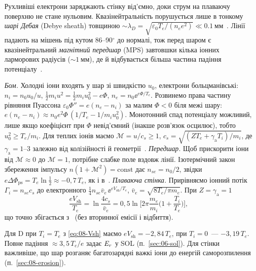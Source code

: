 Рухливіші електрони заряджають стінку від'ємно, доки струм на плаваючу поверхню не стане нульовим. Квазінейтральність порушується лише в тонкому \emph{шарі Дебая} (Debye sheath) товщиною $\sim\lambda_D=\sqrt{\varepsilon_0T_e/(n_ee^2)}\ll\SI{0,1}{мм}$~\cite[с.~23]{AhoMantila2011}. Лінії падають на мішень під кутом 86--90$^\circ$ до нормалі, тож перед шаром є квазінейтральний \emph{магнітний передшар} (MPS) завтовшки кілька іонних ларморових радіусів ($\sim\SI{1}{мм}$), де й відбувається більша частина падіння потенціалу~\cite[с.~23]{AhoMantila2011}.

\begin{derivation}
\emph{Бом.} Холодні іони входять у шар зі швидкістю $u_0$, електрони больцманівські: $n_i=n_0u_0/u$, $\tfrac12m_iu^2=\tfrac12m_iu_0^2-e\Phi$, $n_e=n_0\ee^{e\Phi/T_e}$. Розвинемо права частину рівняння Пуассона $\varepsilon_0\Phi''=e(n_e-n_i)$ за малим $\Phi<0$ біля межі шару: $e(n_e-n_i)\approx n_0e^2\Phi\,(1/T_e-1/m_iu_0^2)$. Монотонний спад потенціалу можливий, лише якщо коефіцієнт при $\Phi$ невід'ємний (інакше розв'язок осцилює), тобто $u_0^2\ge T_e/m_i$. Для теплих іонів маємо $\mathcal{M}=u/c_s\ge1$, $c_s=\sqrt{(ZT_e+\gamma_{\mathrm a}T_i)/m_i}$, де $\gamma_{\mathrm a}=1$--3 залежно від колізійності й геометрії~\cite[с.~24]{AhoMantila2011}.
\emph{Передшар.} Щоб прискорити іони від $\mathcal{M}\approx0$ до $\mathcal{M}=1$, потрібне слабке поле вздовж лінії. Ізотермічний закон збереження імпульсу $n(1+\mathcal{M}^2)=\mathrm{const}$ дає $n_{se}=n_0/2$, звідки $e\Delta\Phi_{\mathrm{ps}}=T_e\ln\tfrac12\approx-0{,}7\,T_e$, як і в~\cite[с.~24]{AhoMantila2011}.
\emph{Плаваюча стінка.} Прирівняємо іонний потік $\Gamma_i=n_{se}c_s$ до електронного $\tfrac14n_{se}\bar v_e\,\ee^{eV_{\mathrm{sh}}/T_e}$, $\bar v_e=\sqrt{8T_e/\pi m_e}$. При $Z=\gamma_{\mathrm a}=1$
\begin{equation}\label{eq:08-Vsh}
  \frac{eV_{\mathrm{sh}}}{T_e}=\ln\frac{4c_s}{\bar v_e}=0{,}5\ln\Big[2\pi\frac{m_e}{m_i}\Big(1+\frac{T_i}{T_e}\Big)\Big],
\end{equation}
що точно збігається з~\cite[с.~23, (2.1)]{AhoMantila2011} (без вторинної емісії і відбиття).
\end{derivation}

Для D при $T_i=T_e$ з \eqref{eq:08-Vsh} маємо $eV_{\mathrm{sh}}=-2{,}84\,T_e$, при $T_i=0$~--- $-3{,}19\,T_e$. Повне падіння $\approx3{,}5\,T_e/e$ задає $E_{r}$ у SOL (п.~\ref{sec:06-sol}). Для стінки важливіше, що шар розганяє багатозарядні важкі іони до енергій саморозпилення (п.~\ref{sec:08-erosion}).

